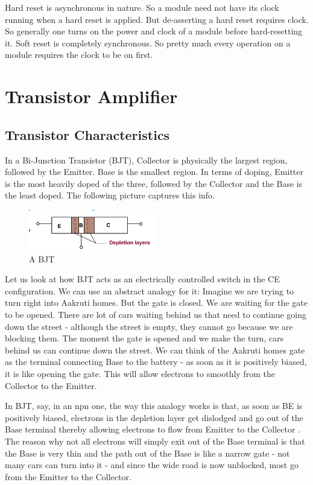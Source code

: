 Hard reset is asynchronous in nature. So a module need not have its clock running when a hard reset is applied. But de-asserting a hard reset requires clock. So generally one turns on the power and clock of a module before hard-resetting it. Soft reset is completely synchronous. So pretty much every operation on a module requires the clock to be on first.


\chapter{Transistor Amplifier}
\section{Transistor Characteristics}
In a Bi-Junction Transistor (BJT), Collector is physically the largest region, followed by the Emitter. Base is the smallest region. In terms of doping, Emitter is the most heavily doped of the three, followed by the Collector and the Base is the least doped. The following picture captures this info. 

	\begin{figure}[h!]
	\centering
	\includegraphics[width = 0.5\textwidth]{partHW/BJT_Regions}
	\caption{A BJT}
	\label{fig:bjt}
	\end{figure}

Let us look at how BJT acts as an electrically controlled switch in the CE configuration. We can use an abstract analogy for it: Imagine we are trying to turn right into Aakruti homes. But the gate is closed. We are waiting for the gate to be opened. There are lot of cars waiting behind us that need to continue going down the street - although the street is empty, they cannot go because we are blocking them. The moment the gate is opened and we make the turn, cars behind us can continue down the street. We can think of the Aakruti homes gate as the terminal connecting Base to the battery - as soon as it is positively biased, it is like opening the gate. This will allow electrons to smoothly from the Collector to the Emitter. 

In BJT, say, in an npn one, the way this analogy works is that, as soon as BE is positively biased, electrons in the depletion layer get dislodged and go out of the Base terminal thereby allowing electrons to flow from Emitter to the Collector \cite{sanghoKim16}. The reason why not all electrons will simply exit out of the Base terminal is that the Base is very thin and the path out of the Base is like a narrow gate - not many cars can turn into it - and since the wide road is now unblocked, most go from the Emitter to the Collector.

